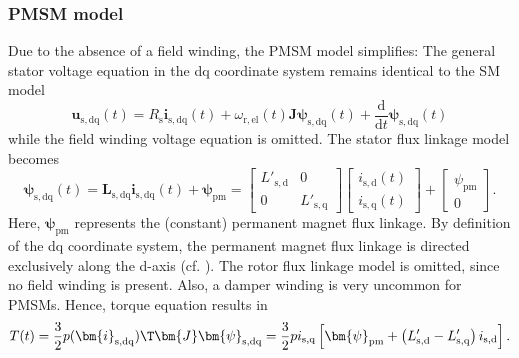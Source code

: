 \begin{frame}
	\frametitle{PMSM model}
	Due to the absence of a field winding, the PMSM model simplifies: The general stator voltage equation in the dq coordinate system remains identical to the SM model
	$$\bm{u}_\mathrm{s,dq}(t) = R_\mathrm{s} \bm{i}_\mathrm{s,dq}(t)+ \omega_\mathrm{r,el}(t)\bm{J}\bm{\psi}_\mathrm{s,dq}(t) + \frac{\mathrm{d}}{\mathrm{d}t}\bm{\psi}_\mathrm{s,dq}(t)$$
	while the field winding voltage equation is omitted. \pause The stator flux linkage model becomes
	\begin{equation}
		\bm{\psi}_\mathrm{s,dq}(t) = \bm{L}_\mathrm{s,dq}\bm{i}_{\mathrm{s,dq}}(t) + \bm{\psi}_\mathrm{pm} = \begin{bmatrix}
			L'_\mathrm{s,d} & 0\\
			0 & L'_\mathrm{s,q}
		\end{bmatrix} \begin{bmatrix}
			i_{\mathrm{s,d}}(t) \\ i_{\mathrm{s,q}}(t)
		\end{bmatrix} + \begin{bmatrix}
			\psi_\mathrm{pm} \\ 0
		\end{bmatrix}.
	\end{equation}
	Here, $\bm{\psi}_\mathrm{pm}$ represents the (constant) permanent magnet flux linkage. \pause By definition of the dq coordinate system, the permanent magnet flux linkage is directed exclusively along the d-axis (cf. ). The rotor flux linkage model is omitted, since no field winding is present. Also, a damper winding is very uncommon for PMSMs. \pause Hence, torque equation results in
	\begin{equation}
		T(t) = \frac{3}{2} p (\bm{i}_\mathrm{s,dq})\T\bm{J}\bm{\psi}_\mathrm{s,dq} = \frac{3}{2} p i_\mathrm{s,q}\left[ \bm{\psi}_\mathrm{pm} + \left(L'_\mathrm{s,d}-L'_\mathrm{s,q}\right)i_\mathrm{s,d}\right].
	\end{equation}
\end{frame}

